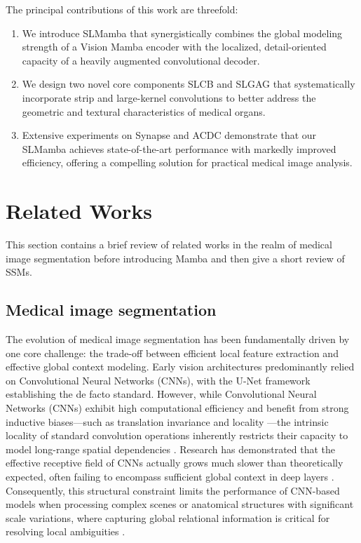 \documentclass[runningheads]{llncs}
\begin{document}
The principal contributions of this work are threefold: 
\begin{enumerate}
\item We introduce SLMamba that synergistically combines the global modeling strength of a Vision Mamba encoder with the localized, detail-oriented capacity of a heavily augmented convolutional decoder. 
\item We design two novel core components SLCB and SLGAG that systematically incorporate strip and large-kernel convolutions to better address the geometric and textural characteristics of medical organs. 
\item Extensive experiments on Synapse and ACDC demonstrate that our SLMamba achieves state-of-the-art performance with markedly improved efficiency, offering a compelling solution for practical medical image analysis.
\end{enumerate}


\section{Related Works}

This section contains a brief review of related works in the realm of medical image segmentation before introducing Mamba and then give a short review of SSMs.

\subsection{Medical image segmentation}

The evolution of medical image segmentation has been fundamentally driven by one core challenge: the trade-off between efficient local feature extraction and effective global context modeling. Early vision architectures predominantly relied on Convolutional Neural Networks (CNNs)\cite{ronneberger2015unet}, with the U-Net framework establishing the de facto standard. However, while Convolutional Neural Networks (CNNs) exhibit high computational efficiency and benefit from strong inductive biases—such as translation invariance and locality \cite{lecun2015deep, he2016resnet}—the intrinsic locality of standard convolution operations inherently restricts their capacity to model long-range spatial dependencies \cite{wang2018nonlocal}. Research has demonstrated that the effective receptive field of CNNs actually grows much slower than theoretically expected, often failing to encompass sufficient global context in deep layers \cite{luo2016erf}. Consequently, this structural constraint limits the performance of CNN-based models when processing complex scenes or anatomical structures with significant scale variations, where capturing global relational information is critical for resolving local ambiguities \cite{dosovitskiy2020vit, chen2021transunet}.
\end{document}
